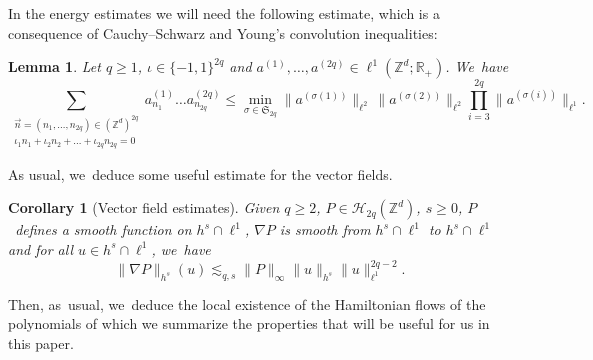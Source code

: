 \documentclass[JEP,XML,SOM,Unicode,published]{cedram}
\theoremstyle{plain}
\newtheorem{corollary}[theorem]{Corollary}
\newtheorem{lemma}[theorem]{Lemma}
\theoremstyle{definition}
\newcommand{\Z}{\mathbb{Z}}
\newcommand{\R}{\mathbb{R}}
\newcommand{\1}{\mathbf{1}}
\begin{document}
In the energy estimates we will need the following estimate, which is a consequence of Cauchy--Schwarz and Young's convolution inequalities:
\begin{lemma}
\label{lem:young}
Let $q\geq1$, $\iota \in \{-1,1\}^{2q}$ and $a^{(1)},\dots, a^{(2q)}\in \ell^1(\Z^d ; \R_+)$. We~have
\[
\sum_{\substack{\vec{n}=(n_1,\dots,n_{2q})\in(\Z^d)^{2q}\\ \iota_1n_1+\iota_2n_2+\dots +\iota_{2q}n_{2q}=0}}a_{n_1}^{(1)}\dots a_{n_{2q}}^{(2q)}\leq\underset{{\sigma\in\mathfrak{S}_{2q}}}\min \| a^{(\sigma(1))} \|_{\ell^2}\,\| a^{(\sigma(2))} \|_{\ell^2} \prod_{i=3}^{2q}\| a^{(\sigma(i))} \|_{\ell^1}.
\]
\end{lemma}
As usual, we~deduce some useful estimate for the vector fields.
\begin{corollary}[Vector field estimates]\label{cor:vecfi} Given $q\geq 2$, $P\in \mathcal{H}_{2q}(\mathbb{Z}^d)$, $s\geq 0$, $P$~defines a smooth function on $h^s \cap \ell^1$, $\nabla P$ is smooth from $h^s \cap \ell^1$ to $h^s \cap \ell^1$ and for all $u\in h^s \cap \ell^1$, we~have
\[
\|\nabla P\|_{h^s}(u) \lesssim_{q,s} \| P \|_{\infty} \|u\|_{h^s} \|u\|_{\ell^1}^{2q-2}.
\]
\end{corollary}
Then, as~usual, we~deduce the local existence of the Hamiltonian flows of the polynomials of which we summarize the properties that will be useful for us in this paper.
\end{document}
